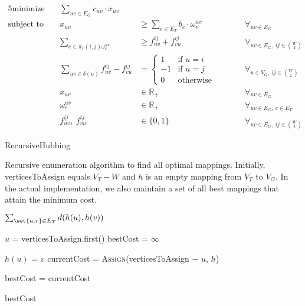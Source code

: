 \begin{alignat*}{5}
    \text{minimize}\ && \sum_{uv \in E_G} c_{uv} \cdot x_{uv} &&& \\
    \text{subject to}\ && x_{uv} &\ge \sum_{e \in E_T} b_e \cdot \omega_e^{uv} &&\qquad \forall_{uv \in E_G} \\
    && \sum_{e \in \pi_T(i,j) \omega_e^{uv}} &\ge f_{uv}^{ij} + f_{vu}^{ij} &&\qquad \forall_{uv \in E_G,\ ij \in \binom{W}{2}} \\
    && \sum_{uv \in \delta(u)} f_{uv}^{ij} - f_{vu}^{ij} &= \begin{cases}
                                                                1 & \text{if $u = i$} \\
                                                                -1 & \text{if $u = j$} \\
                                                                0 & \text{otherwise}
    \end{cases} &&\qquad \forall_{u \in V_G,\ ij \in \binom{W}{2}} \\
    && x_{uv} &\in \mathbb{R}_+ &&\qquad \forall_{uv \in E_G} \\
    && \omega_e^{uv} &\in \mathbb{R}_+ &&\qquad \forall_{uv \in E_G,\ e \in E_T} \\
    && f_{uv}^{ij},\ f_{vu}^{ij} &\in \{ 0, 1 \} &&\qquad \forall_{uv \in E_G,\ ij \in \binom{W}{2}}
\end{alignat*}%

\begin{algorithm}
    \caption{RecursiveHubbing}
    \label{alg:TriangulateStar}
    \begin{algorithmic}[1]
        \Statex Recursive enumeration algorithm to find all optimal mappings. Initially, verticesToAssign equals $V_T - W$ and $h$ is an empty mapping from $V_T$ to $V_G$. In the actual implementation, we also maintain a set of all best mappings that attain the minimum cost.

                \State \Return $\sum_{\set{u, v} \in E_T} d(h(u), h(v))$ 
            \EndIf

            \State $u$ = verticesToAssign.first()
            \State bestCost = $\infty$

                \State $h(u)$ = $v$
                \State currentCost = \textsc{Assign}(verticesToAssign $-$ $u$, $h$)

                    \State bestCost = currentCost
                \EndIf
            \EndFor

            \State \Return bestCost
        \EndProcedure
    \end{algorithmic}
\end{algorithm}

